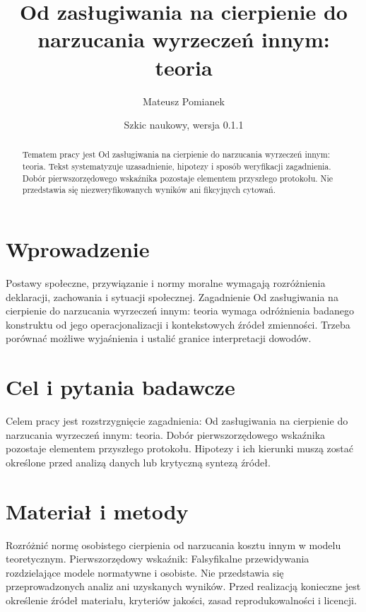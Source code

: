 \documentclass[11pt,a4paper]{article}
\title{Od zasługiwania na cierpienie do narzucania wyrzeczeń innym: teoria}
\author{Mateusz Pomianek}
\date{Szkic naukowy, wersja 0.1.1}
\begin{document}
\maketitle

\begin{abstract}

Tematem pracy jest Od zasługiwania na cierpienie do narzucania wyrzeczeń innym: teoria. Tekst systematyzuje uzasadnienie, hipotezy i sposób weryfikacji zagadnienia. Dobór pierwszorzędowego wskaźnika pozostaje elementem przyszłego protokołu. Nie przedstawia się niezweryfikowanych wyników ani fikcyjnych cytowań.

\end{abstract}

\section{Wprowadzenie}

Postawy społeczne, przywiązanie i normy moralne wymagają rozróżnienia deklaracji, zachowania i sytuacji społecznej. Zagadnienie Od zasługiwania na cierpienie do narzucania wyrzeczeń innym: teoria wymaga odróżnienia badanego konstruktu od jego operacjonalizacji i kontekstowych źródeł zmienności. Trzeba porównać możliwe wyjaśnienia i ustalić granice interpretacji dowodów.

\section{Cel i pytania badawcze}

Celem pracy jest rozstrzygnięcie zagadnienia: Od zasługiwania na cierpienie do narzucania wyrzeczeń innym: teoria. Dobór pierwszorzędowego wskaźnika pozostaje elementem przyszłego protokołu. Hipotezy i ich kierunki muszą zostać określone przed analizą danych lub krytyczną syntezą źródeł.

\section{Materiał i metody}

Rozróżnić normę osobistego cierpienia od narzucania kosztu innym w modelu teoretycznym. Pierwszorzędowy wskaźnik: Falsyfikalne przewidywania rozdzielające modele normatywne i osobiste. Nie przedstawia się przeprowadzonych analiz ani uzyskanych wyników. Przed realizacją konieczne jest określenie źródeł materiału, kryteriów jakości, zasad reprodukowalności i licencji.
\end{document}
